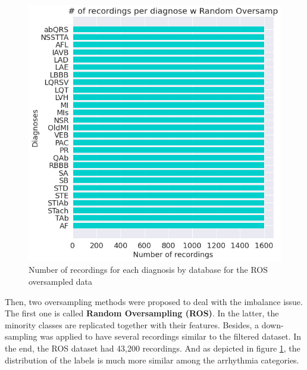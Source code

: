 \begin{figure}[H]
\centering
\includegraphics[scale=0.4]{img/label_distro_ros.png}
\caption{Number of recordings for each diagnosis by database for the ROS oversampled data}
\label{fig:label_distro_ros}
\end{figure}

Then, two oversampling methods were proposed to deal with the imbalance issue. The first one is called \textbf{Random Oversampling (ROS)}. In the latter, the minority classes are replicated together with their features. Besides, a down-sampling was applied to have several recordings similar to the filtered dataset. In the end, the ROS dataset had 43,200 recordings. And as depicted in figure \ref{fig:label_distro_ros}, the distribution of the labels is much more similar among the arrhythmia categories.


